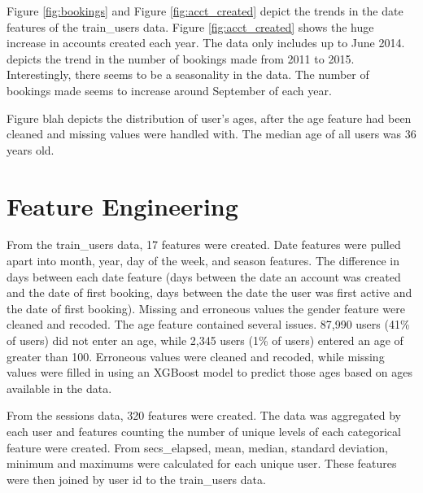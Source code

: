 \documentclass{article}
\begin{document}
Figure \ref{fig:bookings} and Figure \ref{fig:acct_created} depict the trends in the date features of
the train\_users data. Figure \ref{fig:acct_created} shows the huge increase in accounts created each year. 
The data only includes up to June 2014. 
depicts the trend in the number of bookings made from 2011 to 2015.
Interestingly, there seems to be a seasonality in the data. The number of bookings made seems to 
increase around September of each year. 




Figure blah depicts the distribution of user's ages, after the age feature had been cleaned and 
missing values were handled with. The median age of all users was 36 years old. 




\section{Feature Engineering}

From the train\_users data, 17 features were created. Date features were pulled apart into 
month, year, day of the week, and season features. The difference in days between each date feature 
(days between the date an account was created and the date of first booking, days between the date the 
user was first active and the date of first booking). Missing and erroneous values the gender feature 
were cleaned and recoded. The age feature contained several issues. 87,990 users (41\% of users) did 
not enter an age, while 2,345 users (1\% of users) entered an age of greater than 100. Erroneous values 
were cleaned and recoded, while missing values were filled in using an XGBoost model to predict those 
ages based on ages available in the data. 

From the sessions data, 320 features were created. The data was aggregated by each user and 
features counting the number of unique levels of each categorical feature were created. From secs\_elapsed, 
mean, median, standard deviation, minimum and maximums were calculated for each unique user. These features 
were then joined by user id to the train\_users data. 
\end{document}
